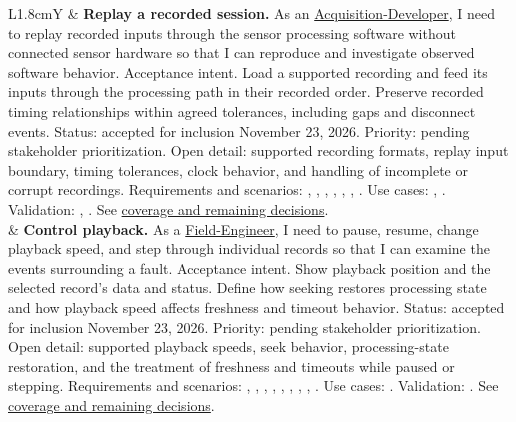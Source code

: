 \begin{tabularx}{\linewidth}{L{1.8cm}Y}
 & \textbf{Replay a recorded session.} As an \hyperref[Stakeholder:Acquisition-Developer]{Acquisition-Developer}, I need to replay recorded inputs through the sensor processing software without connected sensor hardware so that I can reproduce and investigate observed software behavior. Acceptance intent. Load a supported recording and feed its inputs through the processing path in their recorded order. Preserve recorded timing relationships within agreed tolerances, including gaps and disconnect events. Status: accepted for inclusion November 23, 2026. Priority: pending stakeholder prioritization. Open detail: supported recording formats, replay input boundary, timing tolerances, clock behavior, and handling of incomplete or corrupt recordings. Requirements and scenarios: , , , , , , . Use cases: , . Validation: , . See \hyperref[Section:RecordingPlaybackTraceGaps]{coverage and remaining decisions}.\\
 & \textbf{Control playback.} As a \hyperref[Stakeholder:Field-Engineer]{Field-Engineer}, I need to pause, resume, change playback speed, and step through individual records so that I can examine the events surrounding a fault. Acceptance intent. Show playback position and the selected record's data and status. Define how seeking restores processing state and how playback speed affects freshness and timeout behavior. Status: accepted for inclusion November 23, 2026. Priority: pending stakeholder prioritization. Open detail: supported playback speeds, seek behavior, processing-state restoration, and the treatment of freshness and timeouts while paused or stepping. Requirements and scenarios: , , , , , , , , . Use cases: . Validation: . See \hyperref[Section:RecordingPlaybackTraceGaps]{coverage and remaining decisions}.\\

\end{tabularx}
